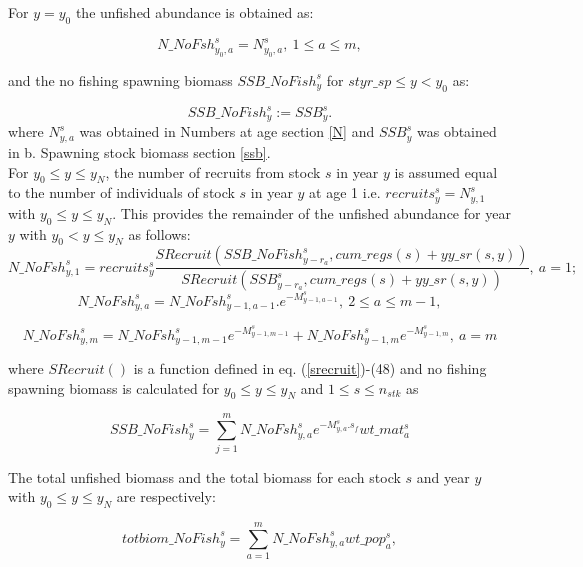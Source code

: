 \documentclass{article}
\begin{document}
For $y=y_0$ the unfished abundance is obtained as:

\begin{equation}
N\_NoFsh^s_{y_0,a}=N^s_{y_0,a}, \ 1\leq a \leq m,
\end{equation}

and the no fishing spawning biomass $SSB\_NoFish^s_y$ for $styr\_sp \leq y < y_0$ as:

\begin{equation}
    SSB\_NoFish^s_y:=SSB^s_{y}.
\end{equation}
where $N^s_{y,a}$ was obtained in Numbers at age section \ref{N} and $SSB^s_{y}$ was obtained in b. Spawning stock biomass section \ref{ssb}.\\

For $y_0\leq y \leq y_N$, the number of recruits from stock $s$ in year $y$ is assumed equal to the number of individuals of stock $s$ in year $y$ at age 1 i.e. $recruits^s_y=N^s_{y,1}$ with $y_0 \leq y \leq y_N$. This provides the remainder of the unfished abundance for year $y$ with $y_0 < y \leq y_N$ as follows:
\begin{equation}
    N\_NoFsh^s_{y,1} = recruits^s_y \dfrac{SRecruit(SSB\_NoFish^s_{y-r_a},cum\_regs(s)+yy\_sr(s,y))}{SRecruit(SSB^s_{y-r_a},cum\_regs(s)+yy\_sr(s,y))}, \ a=1;
\end{equation}
\begin{equation}
    N\_NoFsh^s_{y,a}=N\_NoFsh^s_{y-1,a-1}.e^{-M^s_{y-1, a-1}}, \ 2\leq a \leq m-1, 
\end{equation}

\begin{equation}
    N\_NoFsh^s_{y,m}=N\_NoFsh^s_{y-1,m-1} e^{-M^s_{y-1,m-1}}+N\_NoFsh^s_{y-1,m} e^{-M^s_{y-1,m}}, \ a=m
\end{equation}

where $SRecruit()$ is a function defined in eq. (\ref{srecruit})-(48) and no fishing spawning biomass is calculated for $y_0 \leq y \leq y_N$ and $1\leq s \leq n_{stk}$ as

\begin{equation}
SSB\_NoFish^s_y=\sum_{j=1}^m N\_NoFsh^s_{y,a}  e^{-M^s_{y,a}.s_f} wt\_mat^s_a
\end{equation}

The total unfished biomass  and the total biomass  for each stock $s$ and year $y$ with $y_0 \leq y \leq y_N$ are respectively:


\begin{equation}
    totbiom\_NoFish^s_y=\sum_{a=1}^m N\_NoFsh^s_{y,a}wt\_pop^s_a,
\end{equation}
\end{document}
